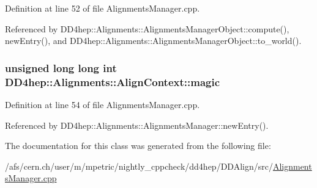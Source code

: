 Definition at line 52 of file AlignmentsManager.cpp.

Referenced by DD4hep::Alignments::AlignmentsManagerObject::compute(), newEntry(), and DD4hep::Alignments::AlignmentsManagerObject::to\_\-world().\hypertarget{class_d_d4hep_1_1_alignments_1_1_align_context_ab1fa723ae13a70098621bf9f91decf62}{
\subsubsection[{magic}]{\setlength{\rightskip}{0pt plus 5cm}unsigned long long int {\bf DD4hep::Alignments::AlignContext::magic}}}
\label{class_d_d4hep_1_1_alignments_1_1_align_context_ab1fa723ae13a70098621bf9f91decf62}


Definition at line 54 of file AlignmentsManager.cpp.

Referenced by DD4hep::Alignments::AlignmentsManager::newEntry().

The documentation for this class was generated from the following file:\begin{DoxyCompactItemize}
\item 
/afs/cern.ch/user/m/mpetric/nightly\_\-cppcheck/dd4hep/DDAlign/src/\hyperlink{_alignments_manager_8cpp}{AlignmentsManager.cpp}\end{DoxyCompactItemize}

